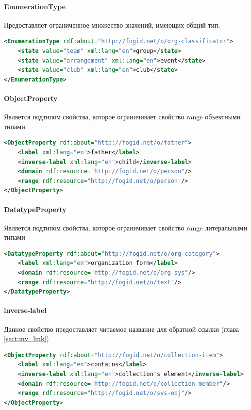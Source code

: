 \documentclass[12pt]{article}
\begin{document}
\paragraph{EnumerationType} Предоставляет ограниченное множество значений, имеющих общий тип.

\begin{lstlisting}[language=XML]
<EnumerationType rdf:about="http://fogid.net/o/org-classificator">
    <state value="team" xml:lang="en">group</state>
    <state value="arrangement" xml:lang="en">event</state>
    <state value="club" xml:lang="en">club</state>
</EnumerationType>
\end{lstlisting}

\paragraph{ObjectProperty} Является подтипом свойства, которое ограничивает свойство range объектными типами
\begin{lstlisting}[language=XML]
<ObjectProperty rdf:about="http://fogid.net/o/father">
    <label xml:lang="en">father</label>
    <inverse-label xml:lang="en">child</inverse-label>
    <domain rdf:resource="http://fogid.net/o/person"/>
    <range rdf:resource="http://fogid.net/o/person"/>
</ObjectProperty>
\end{lstlisting}

\paragraph{DatatypeProperty} Является подтипом свойства, которое ограничивает свойство range литеральными типами
\begin{lstlisting}[language=XML]
<DatatypeProperty rdf:about="http://fogid.net/o/org-category">
    <label xml:lang="en">organization form</label>
    <domain rdf:resource="http://fogid.net/o/org-sys"/>
    <range rdf:resource="http://fogid.net/o/text"/>
</DatatypeProperty>
\end{lstlisting}

\paragraph{inverse-label} Данное свойство предоставляет читаемое название для обратной ссылки (глава \ref{sect:inv_link})
\begin{lstlisting}[language=XML]
<ObjectProperty rdf:about="http://fogid.net/o/collection-item">
    <label xml:lang="en">contains</label>
    <inverse-label xml:lang="en">collection's element</inverse-label>
    <domain rdf:resource="http://fogid.net/o/collection-member"/>
    <range rdf:resource="http://fogid.net/o/sys-obj"/>
</ObjectProperty>
\end{lstlisting}
\end{document}
